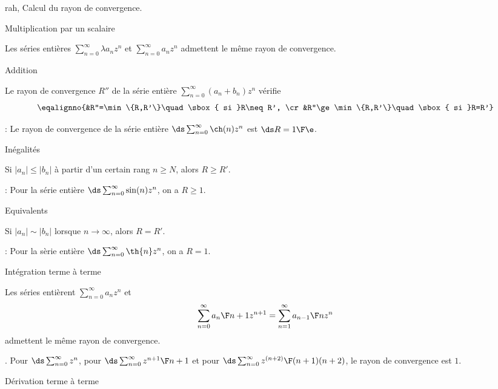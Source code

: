 \Subsection rah, Calcul du rayon de convergence. 


\Concept [Index=Rayon de convergence!Multiplication par un scalaire] Multiplication par un scalaire

Les séries entières $\sum_{n=0}^\infty\lambda a_nz^n$ et $\sum_{n=0}^\infty a_nz^n$ admettent le même rayon de convergence.  

\Concept [Index=Rayon de convergence!Addition] Addition

\Propriete [$R$ et $R'$ rayons de convergences de $\sum_{n=0}^\infty a_nz^n$ et $\sum_{n=0}^\infty b_nz^n$]
Le rayon de convergence $R''$ de la série entière $\sum_{n=0}^\infty(a_n+b_n)z^n$ vérifie 
$$
\eqalignno{&R''=\min\{R,R'\}\quad\sbox{ si }R\neq R', \cr
&R''\ge\min\{R,R'\}\quad\sbox{ si }R=R'} 
$$

\Application : Le rayon de convergence de la série entière $\ds\sum_{n=0}^\infty\ch(n)z^n$ est $\ds R={1\F\e}$. 

\Concept [Index=Rayon de convergence!Inegalites@Inégalités] Inégalités

\Propriete [$R$ et $R'$ rayons de convergences de $\sum_{n=0}^\infty a_nz^n$ et $\sum_{n=0}^\infty b_nz^n$]
Si $|a_n|\le |b_n|$ à partir d'un certain rang $n\ge N$, alors $R\ge R'$. 

\Application : Pour la série entière $\ds\sum_{n=0}^\infty\sin(n) z^n$, on a $R\ge 1$. 

\Concept [Index=Rayon de convergence!Equivalents] Equivalents

\Propriete [$R$ et $R'$ rayons de convergences de $\sum_{n=0}^\infty a_nz^n$ et $\sum_{n=0}^\infty b_nz^n$]
Si $|a_n|\sim|b_n|$ lorsque $n\to\infty$, alors $R=R'$. 

\Application : Pour la sèrie entière $\ds\sum_{n=0}^\infty\th{n}z^n$, on a $R=1$. 

\Concept [Index=Rayon de convergence!Integration terme a terme] Intégration terme à terme

Les séries entièrent $\sum_{n=0}^\infty a_nz^n$ et 
$$
\sum\limits_{n=0}^\infty {a_n\F n+1}z^{n+1}=\sum_{n=1}^\infty{a_{n-1}\F n}z^n
$$
admettent le même rayon de convergence. 

\Exemple. Pour $\ds\sum_{n=0}^\infty z^n$, pour $\ds\sum_{n=0}^\infty{z^{n+1}\F n+1}$ et pour 
$\ds\sum_{n=0}^\infty{z^{(n+2)}\F (n+1)(n+2)}$, le rayon de convergence est $1$. 

\Concept [Index=Rayon de convergence!Derivation terme a terme@Dérivation terme à terme] Dérivation terme à terme

